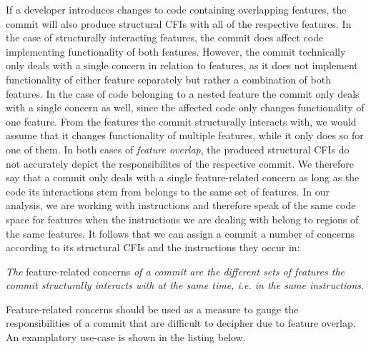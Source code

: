 If a developer introduces changes to code containing overlapping features, the commit will also produce structural CFIs with all of the respective features.
In the case of structurally interacting features, the commit does affect code implementing functionality of both features.
However, the commit technically only deals with a single concern in relation to features, as it does not implement functionality of either feature separately but rather a combination of both features.
In the case of code belonging to a nested feature the commit only deals with a single concern as well, since the affected code only changes functionality of one feature.
From the features the commit structurally interacts with, we would assume that it changes functionality of multiple features, while it only does so for one of them.
In both cases of \emph{feature overlap}, the produced structural CFIs do not accurately depict the responsibilites of the respective commit.
We therefore say that a commit only deals with a single feature-related concern as long as the code its interactions stem from belongs to the same set of features.
In our analysis, we are working with instructions and therefore speak of the same code space for features when the instructions we are dealing with belong to regions of the same features.
It follows that we can assign a commit a number of concerns according to its structural CFIs and the instructions they occur in:
\begin{definition} \label{def:commit_concerns}
\emph{The} feature-related concerns \emph{of a commit are the different sets of features the commit structurally interacts with at the same time, i.e. in the same instructions.}
\end{definition}
Feature-related concerns should be used as a measure to gauge the responsibilities of a commit that are difficult to decipher due to feature overlap. 
An examplatory use-case is shown in the listing below. \\
                             
